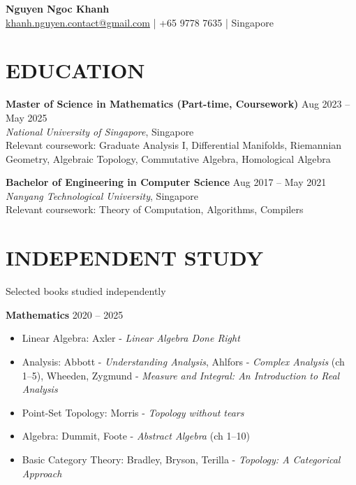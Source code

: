 \documentclass[11pt]{article}
\begin{document}
\begin{center}
    {\LARGE \textbf{Nguyen Ngoc Khanh}} \\
    \href{mailto:khanh.nguyen.contact@gmail.com}{khanh.nguyen.contact@gmail.com} | +65 9778 7635 | Singapore
\end{center}

\vspace{0.2cm}

\section*{EDUCATION}

\textbf{Master of Science in Mathematics (Part-time, Coursework)} \hfill Aug 2023 -- May 2025 \\
\textit{National University of Singapore}, Singapore \\
Relevant coursework: Graduate Analysis I, Differential Manifolds, Riemannian Geometry, Algebraic Topology, Commutative Algebra, Homological Algebra

\textbf{Bachelor of Engineering in Computer Science} \hfill Aug 2017 -- May 2021 \\
\textit{Nanyang Technological University}, Singapore \\
Relevant coursework: Theory of Computation, Algorithms, Compilers

\vspace{-0.3cm}
\section*{INDEPENDENT STUDY}

Selected books studied independently

\textbf{Mathematics} \hfill 2020 -- 2025 

\begin{itemize}[topsep=0pt, partopsep=0pt, itemsep=0pt, parsep=0pt]
	\item Linear Algebra: Axler - \textit{Linear Algebra Done Right}
	\item Analysis: Abbott - \textit{Understanding Analysis}, Ahlfors - \textit{Complex Analysis} (ch 1--5), Wheeden, Zygmund - \textit{Measure and Integral: An Introduction to Real Analysis}
	\item Point-Set Topology: Morris - \textit{Topology without tears}
	\item Algebra: Dummit, Foote - \textit{Abstract Algebra} (ch 1--10)
	\item Basic Category Theory: Bradley, Bryson, Terilla - \textit{Topology: A Categorical Approach}
\end{itemize}
\end{document}
